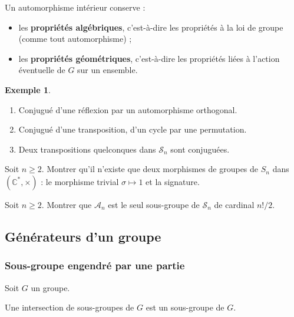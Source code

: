 \documentclass[french]{article}
\newcommand{\C}{\mathbb{C}}
\newcommand{\st}{^*}
\newcommand{\inv}{^{-1}}
\theoremstyle{plain}
\theoremstyle{definition}
\newtheorem*{ex}{Exemple}
\theoremstyle{remark}
\begin{document}
Un automorphisme intérieur conserve :
\begin{itemize}
	\item les \textbf{propriétés algébriques}, c'est-à-dire les propriétés à la loi de groupe (comme tout automorphisme) ;
	\item les \textbf{propriétés géométriques}, c'est-à-dire les propriétés liées à l'action éventuelle de $G$ sur un ensemble.
\end{itemize}

\begin{ex}
	\begin{enumerate}
		\item Conjugué d'une réflexion par un automorphisme orthogonal. %
		\item Conjugué d'une transposition, d'un cycle par une permutation. %
		\item Deux transpositions quelconques dans $\mathcal{S}_n$ sont conjuguées. %
	\end{enumerate}
\end{ex}

\begin{exo}
	Soit $n\geqslant 2$. Montrer qu'il n'existe que deux morphismes de groupes de $S_n$ dans $(\C\st,\times)$ : le morphisme trivial $\sigma\mapsto 1$ et la signature.
\end{exo}

\begin{exo}
	Soit $n\geqslant 2$. Montrer que $\mathcal{A}_n$ est le seul sous-groupe de $\mathcal{S}_n$ de cardinal $n!/2$.
\end{exo}

\subsection{Générateurs d'un groupe}

\subsubsection*{Sous-groupe engendré par une partie}

Soit $G$ un groupe.

\begin{prop}%
	Une intersection de sous-groupes de $G$ est un sous-groupe de $G$.
\end{prop}
\end{document}
